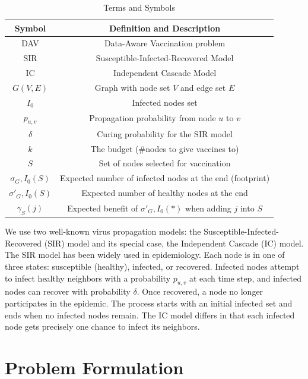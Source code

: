 \documentclass{article}
\begin{document}
\begin{table}[h!]
    \centering
    \begin{tabular}{|c|c|}
        \hline
        Symbol & Definition and Description \\
        \hline
        DAV & Data-Aware Vaccination problem \\
        SIR & Susceptible-Infected-Recovered Model \\
        IC & Independent Cascade Model \\
        $G(V,E)$ & Graph with node set $V$ and edge set $E$ \\
        $I_0$ & Infected nodes set \\
        $p_{u,v}$ & Propagation probability from node $u$ to $v$ \\
        $\delta$ & Curing probability for the SIR model \\
        $k$ & The budget (\#nodes to give vaccines to) \\
        $S$ & Set of nodes selected for vaccination \\
        $\sigma_G,I_0(S)$ & Expected number of infected nodes at the end (footprint) \\
        $\sigma'_G,I_0(S)$ & Expected number of healthy nodes at the end \\
        $\gamma_S(j)$ & Expected benefit of $\sigma'_G,I_0(*)$ when adding $j$ into $S$ \\
        \hline
    \end{tabular}
    \caption{Terms and Symbols}
\end{table}

We use two well-known virus propagation models: the Susceptible-Infected-Recovered (SIR) model and its special case, the Independent Cascade (IC) model. The SIR model has been widely used in epidemiology. Each node is in one of three states: susceptible (healthy), infected, or recovered. Infected nodes attempt to infect healthy neighbors with a probability $p_{u,v}$ at each time step, and infected nodes can recover with probability $\delta$. Once recovered, a node no longer participates in the epidemic. The process starts with an initial infected set and ends when no infected nodes remain. The IC model differs in that each infected node gets precisely one chance to infect its neighbors.

\section{Problem Formulation}
\end{document}
